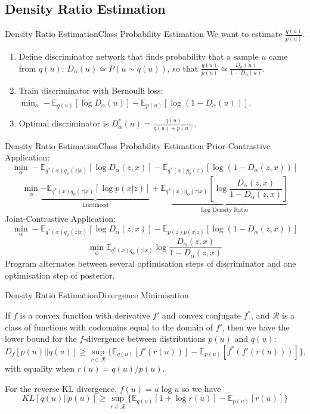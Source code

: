 \documentclass[handout]{beamer}
\begin{document}
\subsection{Density Ratio Estimation}

\begin{frame}{Density Ratio Estimation}{Class Probability Estimation}
We want to estimate $\frac{q(u)}{p(u)}$.
\vspace{0.3cm}
  \begin{enumerate}
  \item {
    Define discriminator network that finds probability that a sample $u$ came from $q(u)$: $D_\alpha(u)\simeq P(u\sim q(u))$, so that $\frac{q(u)}{p(u)}\simeq \frac{D_\alpha(u)}{1-D_\alpha(u)}$.
  }
  \vspace{0.5cm}
  \item {
    Train discriminator with Bernoulli loss: $\min_\alpha -\mathbb{E}_{q(u)}[\log D_\alpha(u)]-\mathbb{E}_{p(u)}[\log(1-D_\alpha(u))]$.
  }
  \vspace{0.5cm}
  \item Optimal discriminator is $D^*_\alpha(u)=\frac{q(u)}{q(u)+p(u)}$.
  \end{enumerate}
\end{frame}
\begin{frame}{Density Ratio Estimation}{Class Probability Estimation}
Prior-Contrastive Application:
\[\min_\alpha -\mathbb{E}_{q^*(x)q_\phi(z|x)}[\log D_\alpha(z,x)]-\mathbb{E}_{q^*(x)p_\theta(z)}[\log (1-D_\alpha(z,x))]\]
\[\min_\phi \underbrace{-\mathbb{E}_{q^*(x)q_\phi(z|x)}[\log p(x|z)]}_\text{Likelihood}+\underbrace{\mathbb{E}_{q^*(x)q_\phi(z|x)}\left[\log \frac{D_\alpha(z,x)}{1-D_\alpha(z,x)}\right]}_\text{Log Density Ratio}\]
Joint-Contrastive Application:
\[\min_\alpha -\mathbb{E}_{q^*(x)q_\phi(z|x)}[\log D_\alpha(z,x)]-\mathbb{E}_{p(z)p(x|z)}[\log (1-D_\alpha(z,x))]\]
\[\min_\phi \mathbb{E}_{q^*(x)q_\phi(z|x)}\log\frac{D_\alpha(z,x)}{1-D_\alpha(z,x)}\]
Program alternates between several optimisation steps of discriminator and one optimisation step of posterior.
\end{frame}
\begin{frame}{Density Ratio Estimation}{Divergence Minimisation}
\begin{theorem}
If $f$ is a convex function with derivative $f'$ and convex conjugate $f^*$, and $\mathcal{R}$ is a class of functions with codomains equal to the domain of $f'$, then we have the lower bound for the $f$-divergence between distributions $p(u)$ and $q(u)$:
\[D_f [p(u)||q(u)]\geq \sup_{r\in \mathcal{R}} \{\mathbb{E}_{q(u)}[f'(r(u))]-\mathbb{E}_{p(u)}[f^*(f'(r(u)))]\},\]
with equality when $r(u)=q(u)/p(u)$.
\end{theorem}
For the reverse KL divergence, $f(u)=u\log u$ so we have
\[KL[q(u)||p(u)]\geq \sup_{r\in \mathcal{R}}\{\mathbb{E}_{q(u)}[1+\log r(u)]-\mathbb{E}_{p(u)}[r(u)]\}\]

\end{frame}
\end{document}

